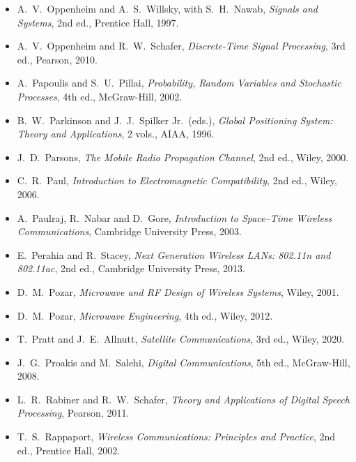 \begin{itemize}[leftmargin=1.5em,itemindent=-1.5em,itemsep=1.5pt plus 1pt,parsep=0pt,topsep=4pt,label={}]
\item A.~V.~Oppenheim and A.~S.~Willsky, with S.~H.~Nawab, \emph{Signals and Systems}, 2nd ed., Prentice Hall, 1997.
\item A.~V.~Oppenheim and R.~W.~Schafer, \emph{Discrete-Time Signal Processing}, 3rd ed., Pearson, 2010.
\item A.~Papoulis and S.~U.~Pillai, \emph{Probability, Random Variables and Stochastic Processes}, 4th ed., McGraw-Hill, 2002.
\item B.~W.~Parkinson and J.~J.~Spilker Jr.\ (eds.), \emph{Global Positioning System: Theory and Applications}, 2 vols., AIAA, 1996.
\item J.~D.~Parsons, \emph{The Mobile Radio Propagation Channel}, 2nd ed., Wiley, 2000.
\item C.~R.~Paul, \emph{Introduction to Electromagnetic Compatibility}, 2nd ed., Wiley, 2006.
\item A.~Paulraj, R.~Nabar and D.~Gore, \emph{Introduction to Space--Time Wireless Communications}, Cambridge University Press, 2003.
\item E.~Perahia and R.~Stacey, \emph{Next Generation Wireless LANs: 802.11n and 802.11ac}, 2nd ed., Cambridge University Press, 2013.
\item D.~M.~Pozar, \emph{Microwave and RF Design of Wireless Systems}, Wiley, 2001.
\item D.~M.~Pozar, \emph{Microwave Engineering}, 4th ed., Wiley, 2012.
\item T.~Pratt and J.~E.~Allnutt, \emph{Satellite Communications}, 3rd ed., Wiley, 2020.
\item J.~G.~Proakis and M.~Salehi, \emph{Digital Communications}, 5th ed., McGraw-Hill, 2008.
\item L.~R.~Rabiner and R.~W.~Schafer, \emph{Theory and Applications of Digital Speech Processing}, Pearson, 2011.
\item T.~S.~Rappaport, \emph{Wireless Communications: Principles and Practice}, 2nd ed., Prentice Hall, 2002.

\end{itemize}
